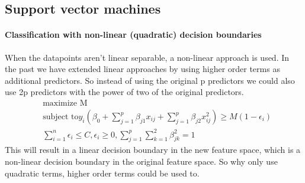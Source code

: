 \documentclass[../document.tex]{subfiles}
\begin{document}
	\subsection{Support vector machines}
	\paragraph{Classification with non-linear (quadratic) decision boundaries}
	When the datapoints aren't linear separable, a non-linear approach is used. In the past we have extended linear approaches by using higher order terms as additional predictors. So instead of using the original p predictors we could also use 2p predictors with the power of two of the original predictors.
	\begin{equation}
	\begin{split}
		&\text{maximize M}\\
		&\text{subject to} y_{i}(\beta_{0}+\sum_{j=1}^{p}\beta_{j1}x_{ij}+\sum_{j=1}^{p}\beta_{j2}x_{ij}^2)\ge M(1-\epsilon_{i})\\
		&\sum_{i=1}^{n}\epsilon_{i}\le C, \epsilon_{i}\ge 0, \sum_{j=1}^{p}\sum_{k=1}^{2}\beta_{jk}^2=1
	\end{split}
	\end{equation}
	This will result in a linear decision boundary in the new feature space, which is a non-linear decision boundary in the original feature space. So why only use quadratic terms, higher order terms could be used to.
\end{document}
